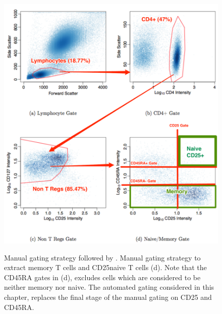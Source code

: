 \begin{figure}
\centering
\begin{minipage}{.8\textwidth}
\includegraphics[width=\linewidth]{figures/il2ra-manual-gating-strategy}
\end{minipage}
{Manual gating strategy followed by \citet{Dendrou:2009dv}.}
{
Manual gating strategy to extract memory T cells and CD25\positive naive T cells (d).
Note that the CD45RA gates in (d), excludes cells which are considered to be neither memory nor naive.
The automated gating considered in this chapter, replaces the final stage of the manual gating on CD25 and CD45RA.
}
\end{figure}

